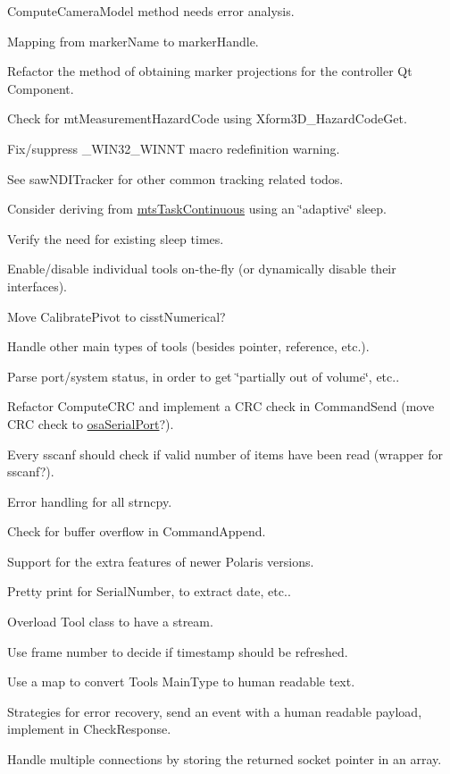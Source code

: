 \begin{DoxyRefList}
Compute\+Camera\+Model method needs error analysis. 

Mapping from marker\+Name to marker\+Handle. 

Refactor the method of obtaining marker projections for the controller Qt Component. 

Check for mt\+Measurement\+Hazard\+Code using Xform3\+D\+\_\+\+Hazard\+Code\+Get. 

Fix/suppress \+\_\+\+W\+I\+N32\+\_\+\+W\+I\+N\+N\+T macro redefinition warning. 

See saw\+N\+D\+I\+Tracker for other common tracking related todos.  
\item[\label{todo__todo000017}%
\hypertarget{todo__todo000017}{}%
File \hyperlink{mts_n_d_i_serial_8h}{mts\+N\+D\+I\+Serial.h} ]Consider deriving from \hyperlink{classmts_task_continuous}{mts\+Task\+Continuous} using an \char`\"{}adaptive\char`\"{} sleep. 

Verify the need for existing sleep times. 

Enable/disable individual tools on-\/the-\/fly (or dynamically disable their interfaces). 

Move Calibrate\+Pivot to cisst\+Numerical? 

Handle other main types of tools (besides pointer, reference, etc.). 

Parse port/system status, in order to get \char`\"{}partially out of volume\char`\"{}, etc.. 

Refactor Compute\+C\+R\+C and implement a C\+R\+C check in Command\+Send (move C\+R\+C check to \hyperlink{classosa_serial_port}{osa\+Serial\+Port}?). 

Every sscanf should check if valid number of items have been read (wrapper for sscanf?). 

Error handling for all strncpy. 

Check for buffer overflow in Command\+Append. 

Support for the extra features of newer Polaris versions. 

Pretty print for Serial\+Number, to extract date, etc.. 

Overload Tool class to have a stream. 

Use frame number to decide if timestamp should be refreshed. 

Use a map to convert Tool\textquotesingle{}s Main\+Type to human readable text. 

Strategies for error recovery, send an event with a human readable payload, implement in Check\+Response.  
\item[\label{todo__todo000018}%
\hypertarget{todo__todo000018}{}%
File \hyperlink{mts_open_i_g_t_link_8h}{mts\+Open\+I\+G\+T\+Link.h} ]Handle multiple connections by storing the returned socket pointer in an array. 


\end{DoxyRefList}
